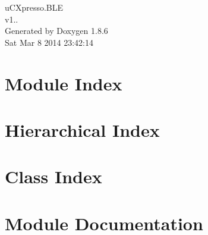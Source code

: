 \documentclass[twoside]{book}
\newcommand{\clearemptydoublepage}{%
  \newpage{\pagestyle{empty}\cleardoublepage}%
}
\begin{document}
\hypersetup{pageanchor=false}
\begin{titlepage}
\vspace*{7cm}
\begin{center}%
{\Large u\-C\-Xpresso.\-B\-L\-E \\[1ex]\large v1.. }\\
\vspace*{1cm}
{\large Generated by Doxygen 1.8.6}\\
\vspace*{0.5cm}
{\small Sat Mar 8 2014 23:42:14}\\
\end{center}
\end{titlepage}
\clearemptydoublepage
\tableofcontents
\clearemptydoublepage
{}
\hypersetup{pageanchor=true}

\chapter{Module Index}

\chapter{Hierarchical Index}

\chapter{Class Index}

\chapter{Module Documentation}

\end{document}
